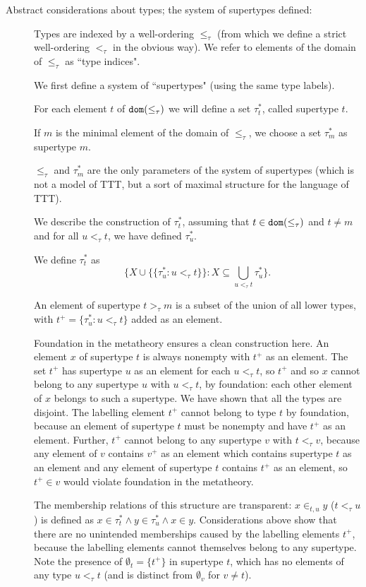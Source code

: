 \documentclass[112pt]{article}
\begin{document}
\begin{description}
\item[Abstract considerations about types; the system of supertypes defined:]  Types are indexed by a well-ordering $\leq_\tau$ (from which we define a strict well-ordering $<_\tau$ in the obvious way).
We refer to elements of the domain of $\leq_\tau$ as ``type indices".

We first define a system of ``supertypes" (using the same type labels).

For each element $t$ of ${\tt dom}(\leq_\tau)$ we will define a set $\tau^*_t$, called supertype $t$.

If $m$ is the minimal element of the domain of $\leq_\tau$, we choose a set $\tau^*_m$ as supertype $m$.

$\leq_\tau$ and $\tau^*_m$ are the only parameters of the system of supertypes (which is not a model of TTT, but a sort of maximal structure for the language of TTT).

We describe the construction of $\tau^*_t$, assuming that $t \in {\tt dom}(\leq_\tau)$ and $t \neq m$ and for all $u <_\tau t$, we have
defined $\tau^*_u$.

We define $\tau^*_t$ as $$\{X \cup \{\{\tau^*_u:u <_\tau t\}\}:X \subseteq \bigcup_{u <_\tau t}\tau^*_u\}.$$

An element of supertype $t>_\tau m$ is a subset of the union of all lower types, with $t^+ = \{\tau^*_u:u <_\tau t\}$ added as an element.

Foundation in the metatheory ensures a clean construction here.  An element $x$ of supertype $t$ is always nonempty with $t^+$ as an element.  The set $t^+$ has supertype $u$ as an element for each $u <_\tau t$, so $t^+$ and so $x$  cannot belong to any supertype $u$ with $u <_\tau t$, by foundation:  each other element of $x$ belongs to such a supertype.  We have shown that all the types are disjoint.  The labelling element $t^+$ cannot belong to type $t$ by foundation, because an element of supertype $t$ must be nonempty and have $t^+$ as an element.  Further, $t^+$ cannot belong to any supertype $v$ with $t <_\tau v$, because any element of $v$ contains $v^+$ as an element which contains supertype $t$ as an element and any element of supertype $t$ contains $t^+$ as an element, so $t^+ \in v$ would violate foundation in the metatheory.

The membership relations of this structure are transparent:  $x \in_{t,u} y$ ($t <_\tau u$) is defined as
$x \in \tau^*_t \wedge y \in \tau^*_u \wedge x \in y$.   Considerations above show that there are no unintended memberships caused by the labelling elements $t^+$, because the labelling elements cannot themselves belong to any supertype.  Note the presence of $\emptyset_t = \{t^+\}$ in supertype $t$, which has no elements of any type $u <_\tau t$ (and is distinct from $\emptyset_v$ for $v \neq t$).


\end{description}
\end{document}
